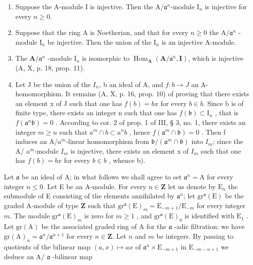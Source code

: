 \begin{enumerate}
\def\labelenumi{\alph{enumi})}
\item
  Suppose the A-module I is injective. Then the \(\mathrm{A} / \mathfrak{a}^n\)-module \(\mathrm{I}_n\) is injective for every \(n \geqslant 0\).
\item
  Suppose that the ring A is Noetherian, and that for every \(n \geqslant 0\) the \(\mathrm{A} / \mathfrak{a}^n\) -module \(\mathrm{I}_n\) be injective. Then the union of the \(\mathrm{I}_n\) is an injective A-module.
\item
  The \(\mathbf{A} / \mathfrak{a}^n\) -module \(\mathrm{I}_n\) is isomorphic to \(\operatorname{Hom}_{\mathbf{A}}(\mathbf{A} / \mathfrak{a}^n, \mathbf{I})\), which is injective (A, X, p. 18, prop. 11).
\item
  Let J be the union of the \(I_{n}\), b an ideal of A, and \(f : b \to J\) an A-homomorphism. It remains (A, X, p. 16, prop. 10) of proving that there exists an element x of J such that one has \(f(b) = bx\) for every \(b \in b\). Since b is of finite type, there exists an integer n such that one has \(f(\mathfrak{b}) \subset \mathrm{I}_{n}\) , that is \(f(\mathfrak{a}^{n}\mathfrak{b}) = 0\) . According to cor. 2 of prop. 1 of III, § 3, no. 1, there exists an integer \(m \geqslant n\) such that \(a^{m} \cap b \subset a^{n}b\) , hence \(f(\mathfrak{a}^{m} \cap \mathfrak{b}) = 0\) . Then f induces an A/\(a^{m}\)-linear homomorphism from \(\mathfrak{b}/(\mathfrak{a}^{m} \cap \mathfrak{b})\) into \(I_{m}\); since the A/ \(a^{m}\)-module \(I_{m}\) is injective, there exists an element x of \(I_{m}\) such that one has \(f(b) = bx\) for every \(b \in b\) , whence b).
\end{enumerate}

Let \(\mathfrak{a}\) be an ideal of A; in what follows we shall agree to set \(\mathfrak{a}^n = \mathrm{A}\) for every integer \(n \leqslant 0\). Let E be an A-module. For every \(n \in \mathbf{Z}\) let us denote by \(\mathrm{E}_n\) the submodule of E consisting of the elements annihilated by \(\mathfrak{a}^n\); let \(\mathrm{gr}^{\mathfrak{a}}(\mathrm{E})\) be the graded A-module of type \(\mathbf{Z}\) such that \(\mathrm{gr}^{\mathfrak{a}}(\mathrm{E})_m = \mathrm{E}_{-m+1}/\mathrm{E}_{-m}\) for every integer \(m\). The module \(\mathrm{gr}^{\mathfrak{a}}(\mathrm{E})_m\) is zero for \(m \geqslant 1\) , and \(\mathrm{gr}^{\mathfrak{a}}(\mathrm{E})_0\) is identified with \(\mathrm{E}_1\) . Let \(\mathrm{gr}(\mathrm{A})\) be the associated graded ring of A for the \(\mathfrak{a}\) -adic filtration: we have \(\mathrm{gr}(\mathrm{A})_n = \mathfrak{a}^n/\mathfrak{a}^{n+1}\) for every \(n \in \mathbf{Z}\). Let \(n\) and \(m\) be integers. By passing to quotients of the bilinear map \((a,x) \mapsto ax\) of \(\mathfrak{a}^n \times \mathrm{E}_{-m+1}\) in \(\mathrm{E}_{-m-n+1}\) we deduce an A/ \(\mathfrak{a}\) -bilinear map


